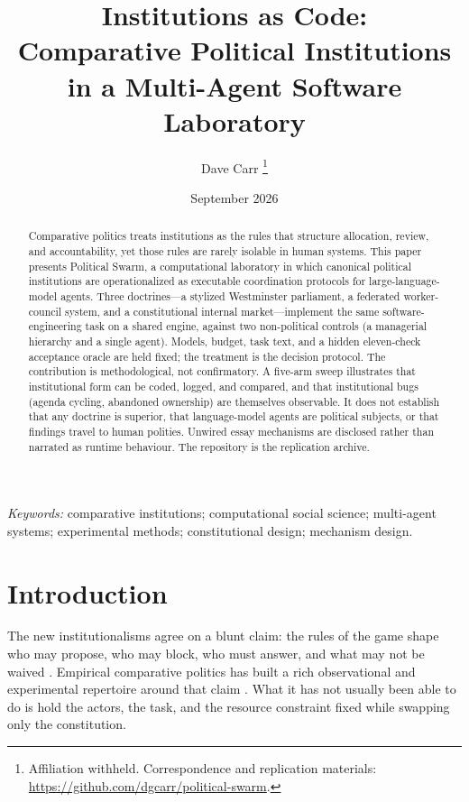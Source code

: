 \documentclass[11pt,a4paper]{article}
\title{Institutions as Code:\\
Comparative Political Institutions in a Multi-Agent Software Laboratory}
\author{Dave Carr%
\thanks{Affiliation withheld. Correspondence and replication materials:
\url{https://github.com/dgcarr/political-swarm}.}}
\date{September 2026}
\begin{document}
\maketitle

\begin{abstract}
Comparative politics treats institutions as the rules that structure allocation, review, and
accountability, yet those rules are rarely isolable in human systems. This paper presents
Political Swarm, a computational laboratory in which canonical political institutions are
operationalized as executable coordination protocols for large-language-model agents. Three
doctrines---a stylized Westminster parliament, a federated worker-council system, and a
constitutional internal market---implement the same software-engineering task on a shared
engine, against two non-political controls (a managerial hierarchy and a single agent).
Models, budget, task text, and a hidden eleven-check acceptance oracle are held fixed; the
treatment is the decision protocol. The contribution is methodological, not confirmatory.
A five-arm sweep illustrates that institutional form can be coded, logged, and compared,
and that institutional bugs (agenda cycling, abandoned ownership) are themselves observable.
It does not establish that any doctrine is superior, that language-model agents are political
subjects, or that findings travel to human polities. Unwired essay mechanisms are disclosed
rather than narrated as runtime behaviour. The repository is the replication archive.
\end{abstract}

\noindent\textit{Keywords:} comparative institutions; computational social science; multi-agent
systems; experimental methods; constitutional design; mechanism design.

\section{Introduction}

The new institutionalisms agree on a blunt claim: the rules of the game shape who may
propose, who may block, who must answer, and what may not be waived
\citep{hall1996,north1990,march1984}. Empirical comparative politics has built a rich
observational and experimental repertoire around that claim
\citep{lijphart1999,tsebelis2002,cox1997,druckman2006}. What it has not usually been able
to do is hold the actors, the task, and the resource constraint fixed while swapping only
the constitution.
\end{document}
